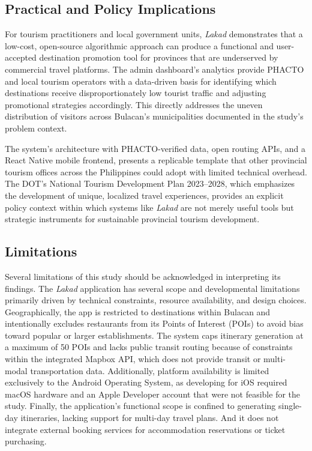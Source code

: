 \subsection{Practical and Policy Implications}
 
For tourism practitioners and local government units, \textit{Lakad}
demonstrates that a low-cost, open-source algorithmic approach
can produce a functional and user-accepted destination promotion
tool for provinces that are underserved by commercial travel
platforms. The admin dashboard’s analytics provide PHACTO and local tourism operators with a data-driven basis for identifying which destinations receive
disproportionately low tourist traffic and adjusting promotional
strategies accordingly. This directly addresses the uneven
distribution of visitors across Bulacan’s municipalities
documented in the study’s problem context.

The system’s architecture with PHACTO-verified data,
open routing APIs, and a React Native mobile frontend, presents
a replicable template that other provincial tourism offices across
the Philippines could adopt with limited technical overhead.
The DOT’s National Tourism Development Plan 2023--2028, which
emphasizes the development of unique, localized travel experiences,
provides an explicit policy context within which systems like
\textit{Lakad} are not merely useful tools but strategic instruments
for sustainable provincial tourism development.
 
\subsection{Limitations}
 
Several limitations of this study should be acknowledged in
interpreting its findings. The \textit{Lakad} application has several scope and developmental limitations primarily driven by technical constraints, resource availability, and design choices. Geographically, the app is restricted to destinations within Bulacan and intentionally excludes restaurants from its Points of Interest (POIs) to avoid bias toward popular or larger establishments. The system caps itinerary generation at a maximum of 50 POIs and lacks public transit routing because of constraints within the integrated Mapbox API, which does not provide transit or multi-modal transportation data. Additionally, platform availability is limited exclusively to the Android Operating System, as developing for iOS required macOS hardware and an Apple Developer account that were not feasible for the study. Finally, the application’s functional scope is confined to generating single-day itineraries, lacking support for multi-day travel plans. And it does not integrate external booking services for accommodation reservations or ticket purchasing.


